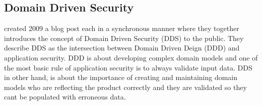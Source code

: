 \subsection{Domain Driven Security}
\textcite{Wilander2009, Johnsson2009} created 2009 a blog post each in a synchronous manner where they together introduces the concept of Domain Driven Security (DDS) to the public. They describe DDS as the intersection between Domain Driven Deign (DDD) and application security. DDD is about developing complex domain models and one of the most basic rule of application security is to always validate input data. DDS in other hand, is about the importance of creating and maintaining domain models who are reflecting the product correctly and they are validated so they cant be populated with erroneous data. \parencite{Wilander2009, Johnsson2009, Arnor2016, Stendahl2016} 